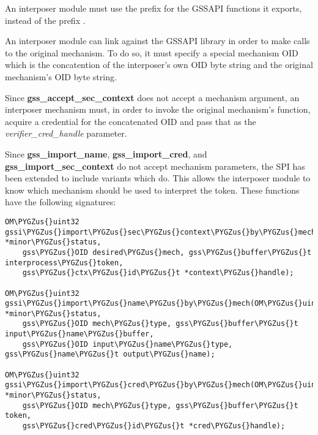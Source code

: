 \documentclass[letterpaper,10pt,english]{sphinxmanual}
\def\PYGZus{\char`\_}
\begin{document}
An interposer module must use the prefix  for the GSSAPI
functions it exports, instead of the prefix .

An interposer module can link against the GSSAPI library in order to
make calls to the original mechanism.  To do so, it must specify a
special mechanism OID which is the concatention of the interposer's
own OID byte string and the original mechanism's OID byte string.

Since \textbf{gss\_accept\_sec\_context} does not accept a mechanism argument,
an interposer mechanism must, in order to invoke the original
mechanism's function, acquire a credential for the concatenated OID
and pass that as the \emph{verifier\_cred\_handle} parameter.

Since \textbf{gss\_import\_name}, \textbf{gss\_import\_cred}, and
\textbf{gss\_import\_sec\_context} do not accept mechanism parameters, the SPI
has been extended to include variants which do.  This allows the
interposer module to know which mechanism should be used to interpret
the token.  These functions have the following signatures:

\begin{Verbatim}[commandchars=\\\{\}]
OM\PYGZus{}uint32 gssi\PYGZus{}import\PYGZus{}sec\PYGZus{}context\PYGZus{}by\PYGZus{}mech(OM\PYGZus{}uint32 *minor\PYGZus{}status,
    gss\PYGZus{}OID desired\PYGZus{}mech, gss\PYGZus{}buffer\PYGZus{}t interprocess\PYGZus{}token,
    gss\PYGZus{}ctx\PYGZus{}id\PYGZus{}t *context\PYGZus{}handle);

OM\PYGZus{}uint32 gssi\PYGZus{}import\PYGZus{}name\PYGZus{}by\PYGZus{}mech(OM\PYGZus{}uint32 *minor\PYGZus{}status,
    gss\PYGZus{}OID mech\PYGZus{}type, gss\PYGZus{}buffer\PYGZus{}t input\PYGZus{}name\PYGZus{}buffer,
    gss\PYGZus{}OID input\PYGZus{}name\PYGZus{}type, gss\PYGZus{}name\PYGZus{}t output\PYGZus{}name);

OM\PYGZus{}uint32 gssi\PYGZus{}import\PYGZus{}cred\PYGZus{}by\PYGZus{}mech(OM\PYGZus{}uint32 *minor\PYGZus{}status,
    gss\PYGZus{}OID mech\PYGZus{}type, gss\PYGZus{}buffer\PYGZus{}t token,
    gss\PYGZus{}cred\PYGZus{}id\PYGZus{}t *cred\PYGZus{}handle);
\end{Verbatim}
\end{document}
